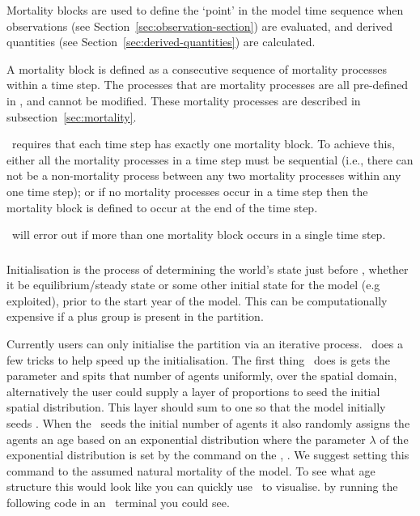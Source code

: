 Mortality blocks are used to define the `point' in the model time sequence when observations (see Section~\ref{sec:observation-section}) are evaluated, and derived quantities (see Section~\ref{sec:derived-quantities}) are calculated.

A mortality block is defined as a consecutive sequence of mortality processes within a time step. The processes that are mortality processes are all pre-defined in \IBM, and cannot be modified. These mortality processes are described in subsection~\ref{sec:mortality}. 

\IBM\ requires that each time step has exactly one mortality block. To achieve this, either all the mortality processes in a time step must be sequential (i.e., there can not be a non-mortality process between any two mortality processes within any one time step); or if no mortality processes occur in a time step then the mortality block is defined to occur at the end of the time step. 

\IBM\ will error out if more than one mortality block occurs in a single time step. 


\subsubsection{}\label{subsec:initialisation}
Initialisation is the process of determining the world's state just before , whether it be equilibrium/steady state or some other initial state for the model (e.g exploited), prior to the start year of the model. This can be computationally expensive if a plus group is present in the partition.

Currently users can only initialise the partition via an iterative process. \IBM\ does a few tricks to help speed up the initialisation. The first thing \IBM\ does is gets the parameter  and spits that number of agents uniformly, over the spatial domain, alternatively the user could supply a layer  of proportions to seed the initial spatial distribution. This layer should sum to one so that the model initially seeds . When the \IBM\ seeds the initial number of agents it also randomly assigns the agents an age based on an exponential distribution where the parameter $\lambda$ of the exponential distribution is set by the command on the , . We suggest setting this command to the assumed natural mortality of the model. To see what age structure this would look like you can quickly use \R\ to visualise. by running the following code in an \R\ terminal you could see.

